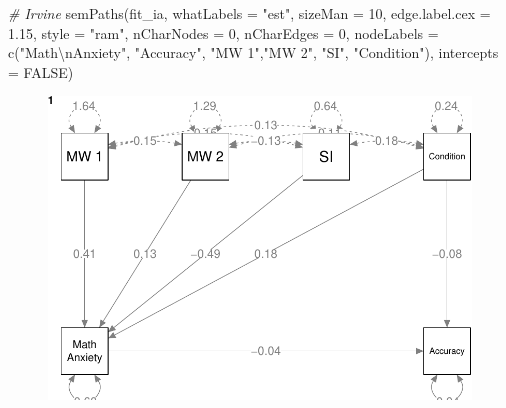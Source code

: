 \documentclass[
  letterpaper,
  DIV=11,
  numbers=noendperiod]{scrartcl}
\newenvironment{Shaded}{\begin{snugshade}}{\end{snugshade}}
\newcommand{\AttributeTok}[1]{\textcolor[rgb]{0.49,0.56,0.16}{#1}}
\newcommand{\CommentTok}[1]{\textcolor[rgb]{0.38,0.63,0.69}{\textit{#1}}}
\newcommand{\ConstantTok}[1]{\textcolor[rgb]{0.53,0.00,0.00}{#1}}
\newcommand{\DecValTok}[1]{\textcolor[rgb]{0.25,0.63,0.44}{#1}}
\newcommand{\FloatTok}[1]{\textcolor[rgb]{0.25,0.63,0.44}{#1}}
\newcommand{\FunctionTok}[1]{\textcolor[rgb]{0.02,0.16,0.49}{#1}}
\newcommand{\NormalTok}[1]{\textcolor[rgb]{0.00,0.44,0.13}{#1}}
\newcommand{\SpecialCharTok}[1]{\textcolor[rgb]{0.25,0.44,0.63}{#1}}
\newcommand{\StringTok}[1]{\textcolor[rgb]{0.25,0.44,0.63}{#1}}
\begin{document}
\begin{Shaded}
\begin{Highlighting}[]
\CommentTok{\# Irvine}
\FunctionTok{semPaths}\NormalTok{(fit\_ia,}
         \AttributeTok{whatLabels =} \StringTok{"est"}\NormalTok{,}
         \AttributeTok{sizeMan =} \DecValTok{10}\NormalTok{,}
         \AttributeTok{edge.label.cex =} \FloatTok{1.15}\NormalTok{,}
         \AttributeTok{style =} \StringTok{"ram"}\NormalTok{,}
         \AttributeTok{nCharNodes =} \DecValTok{0}\NormalTok{, }\AttributeTok{nCharEdges =} \DecValTok{0}\NormalTok{,}
         \AttributeTok{nodeLabels =} \FunctionTok{c}\NormalTok{(}\StringTok{"Math}\SpecialCharTok{\textbackslash{}n}\StringTok{Anxiety"}\NormalTok{, }\StringTok{"Accuracy"}\NormalTok{,}
                        \StringTok{"MW 1"}\NormalTok{,}\StringTok{"MW 2"}\NormalTok{, }\StringTok{"SI"}\NormalTok{, }\StringTok{"Condition"}\NormalTok{),}
         \AttributeTok{intercepts =} \ConstantTok{FALSE}\NormalTok{)}
\end{Highlighting}
\end{Shaded}

\begin{figure}[H]

{\centering \includegraphics{sampling_files/figure-pdf/unnamed-chunk-33-3.pdf}

}

\end{figure}
\end{document}
